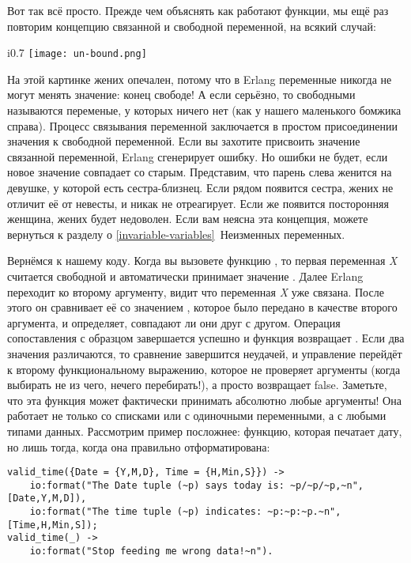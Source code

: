 Вот так всё просто.
Прежде чем объяснять как работают функции, мы ещё раз повторим концепцию связанной и свободной переменной, на всякий случай:
\begin{wrapfigure}{i}{0.7\linewidth}
    \texttt{[image: un-bound.png]}
\end{wrapfigure}
На этой картинке жених опечален, потому что в Erlang переменные никогда не могут менять значение: конец свободе!
А если серьёзно, то свободными называются переменые, у которых ничего нет (как у нашего маленького бомжика справа).
Процесс связывания переменной заключается в простом присоединении значения к свободной переменной.
Если вы захотите присвоить значение связанной переменной, Erlang сгенерирует ошибку.
Но ошибки не будет, если новое значение совпадает со старым.
Представим, что парень слева женится на девушке, у которой есть сестра\--близнец.
Если рядом появится сестра, жених не отличит её от невесты, и никак не отреагирует.
Если же появится посторонняя женщина, жених будет недоволен.
Если вам неясна эта концепция, можете вернуться к разделу о \ref{invariable-variables}~Неизменных переменных.

Вернёмся к нашему коду.
Когда вы вызовете функцию , то первая переменная \emph{X} считается свободной и автоматически принимает значение .
Далее Erlang переходит ко второму аргументу, видит что переменная \emph{X} уже связана.
После этого он сравнивает её со значением , которое было передано в качестве второго аргумента, и определяет, совпадают ли они друг с другом.
Операция сопоставления с образцом завершается успешно и функция возвращает .
Если два значения различаются, то сравнение завершится неудачей, и управление перейдёт к второму функциональному выражению, которое не проверяет аргументы (когда выбирать не из чего, нечего перебирать!), а просто возвращает false.
Заметьте, что эта функция может фактически принимать абсолютно любые аргументы! Она работает не только со списками или с одиночными переменными, а с любыми типами данных.
Рассмотрим пример посложнее: функцию, которая печатает дату, но лишь тогда, когда она правильно отформатирована:
\begin{lstlisting}[style=erlang]
valid_time({Date = {Y,M,D}, Time = {H,Min,S}}) ->
    io:format("The Date tuple (~p) says today is: ~p/~p/~p,~n",[Date,Y,M,D]),
    io:format("The time tuple (~p) indicates: ~p:~p:~p.~n", [Time,H,Min,S]);
valid_time(_) ->
    io:format("Stop feeding me wrong data!~n").
\end{lstlisting}

